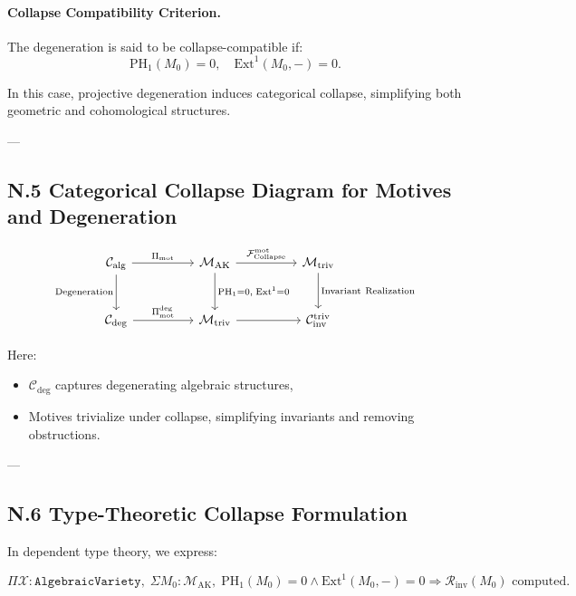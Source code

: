 \documentclass[11pt]{article}
\begin{document}
\paragraph{Collapse Compatibility Criterion.}
The degeneration is said to be collapse-compatible if:
\[
\mathrm{PH}_1(M_0) = 0, \quad \mathrm{Ext}^1(M_0, -) = 0.
\]

In this case, projective degeneration induces categorical collapse, simplifying both geometric and cohomological structures.

---

\subsection*{N.5 Categorical Collapse Diagram for Motives and Degeneration}

\[
\begin{tikzcd}[column sep=huge, row sep=large]
\mathcal{C}_{\mathrm{alg}} \arrow[r, "{\Pi_{\mathrm{mot}}}"] \arrow[d, "{\mathrm{Degeneration}}"']
& \mathcal{M}_{\mathrm{AK}} \arrow[r, "{\mathcal{F}_{\mathrm{Collapse}}^{\mathrm{mot}}}"] \arrow[d, "{\mathrm{PH}_1 = 0,\; \mathrm{Ext}^1 = 0}"]
& \mathcal{M}_{\mathrm{triv}} \arrow[d, "{\mathrm{Invariant\ Realization}}"] \\
\mathcal{C}_{\mathrm{deg}} \arrow[r, "{\Pi_{\mathrm{mot}}^{\mathrm{deg}}}"]
& \mathcal{M}_{\mathrm{triv}} \arrow[r]
& \mathcal{C}_{\mathrm{inv}}^{\mathrm{triv}}
\end{tikzcd}
\]

Here:
\begin{itemize}
  \item \( \mathcal{C}_{\mathrm{deg}} \) captures degenerating algebraic structures,
  \item Motives trivialize under collapse, simplifying invariants and removing obstructions.
\end{itemize}

---

\subsection*{N.6 Type-Theoretic Collapse Formulation}

In dependent type theory, we express:

\[
\Pi \mathcal{X} : \texttt{AlgebraicVariety}, \;
\Sigma M_0 : \mathcal{M}_{\mathrm{AK}}, \;
\mathrm{PH}_1(M_0) = 0 \wedge \mathrm{Ext}^1(M_0, -) = 0
\Rightarrow 
\mathcal{R}_{\mathrm{inv}}(M_0) \text{ computed}.
\]
\end{document}

